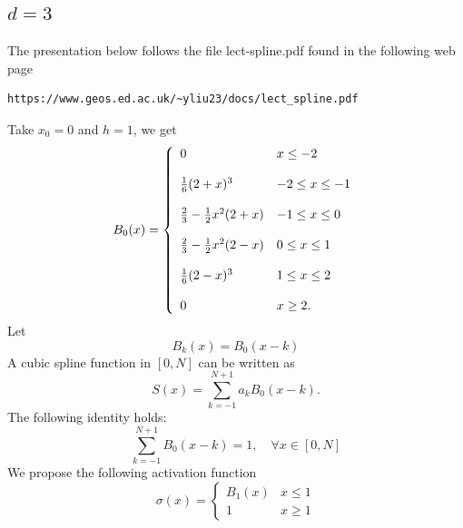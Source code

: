 \subsection{$d=3$}
The presentation below follows the file lect-spline.pdf found in the following web page
\begin{verbatim}
https://www.geos.ed.ac.uk/~yliu23/docs/lect_spline.pdf
\end{verbatim}
Take $x_0=0$ and $h=1$, we get
$$
B_0(x)=
\left\{
  \begin{array}{ll}
0 & x\le -2\\
\\
{1\over 6}(2+x)^3 & -2\le x\le -1\\ 
\\
{2\over 3}-{1\over2}x^2(2+x) & -1\le x\le 0\\  
\\
{2\over 3}-{1\over2}x^2(2-x) & 0\le x\le 1\\  
\\
{1\over 6}(2-x)^3 & 1\le x\le 2\\ 
\\
 0 & x\ge 2.    
  \end{array}
\right.
$$
Let 
$$
B_k(x)=B_0(x-k)
$$
A cubic spline function in $[0,N]$ can be written as
$$
S(x)=\sum_{k=-1}^{N+1}a_kB_0(x-k).
$$
The following identity holds:
\begin{equation}
  \label{eq:1}
\sum_{k=-1}^{N+1}B_0(x-k) =1, \quad\forall x\in [0,N]
\end{equation}
We propose the following activation function
$$
\sigma(x)=
\left\{
  \begin{array}{ll}
B_1(x) & x\le 1 \\
1 & x\ge 1    
  \end{array}
\right.
$$


